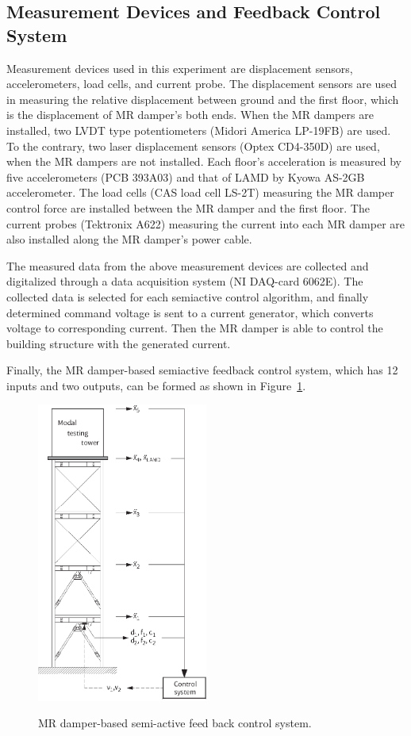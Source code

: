 \subsection{Measurement Devices and Feedback Control System}

Measurement devices used in this experiment are displacement sensors, accelerometers, load cells, and current probe. The displacement sensors are used in measuring the relative displacement between ground and the first floor, which is the displacement of MR damper’s both ends. When the MR dampers are installed, two LVDT type potentiometers (Midori America LP-19FB) are used. To the contrary, two laser displacement sensors (Optex CD4-350D) are used, when the MR dampers are not installed. Each floor’s acceleration is measured by five accelerometers (PCB 393A03) and that of LAMD by Kyowa AS-2GB accelerometer. The load cells (CAS load cell LS-2T) measuring the MR damper control force are installed between the MR damper and the first floor. The current probes (Tektronix A622) measuring the current into each MR damper are also installed along the MR damper’s power cable.

The measured data from the above measurement devices are collected and digitalized through a data acquisition system (NI DAQ-card 6062E). The collected data is selected for each semiactive control algorithm, and finally determined command voltage is sent to a current generator, which converts voltage to corresponding current. Then the MR damper is able to control the building structure with the generated current.

Finally, the MR damper-based semiactive feedback control system, which has 12 inputs and two outputs, can be formed as shown in Figure~\ref{fig:n3-11}.

\begin{figure}[!ht]
\centering
\includegraphics[width=0.50\textwidth] {figure/n3-11.eps}
\label{fig:n3-11}
\caption{MR damper-based semi-active feed back control system.}
\end{figure}

